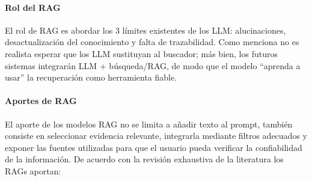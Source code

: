 \paragraph{Rol del RAG} El rol de RAG es abordar los 3 límites existentes de los LLM: alucinaciones, desactualización del conocimiento y falta de trazabilidad.  
Como menciona \textcite{zhai2024llmIR} no es realista esperar que los LLM sustituyan al buscador; más bien, los futuros sistemas integrarán LLM + búsqueda/RAG, de modo que el modelo “aprenda a usar” la recuperación como herramienta fiable.

\paragraph{Aportes de RAG}  
El aporte de los modelos RAG no se limita a añadir texto al prompt, también consiste en seleccionar evidencia relevante, integrarla mediante filtros adecuados y exponer las fuentes utilizadas para que el usuario pueda verificar la confiabilidad de la información.  
De acuerdo con la revisión exhaustiva de la literatura los RAGs aportan:  
